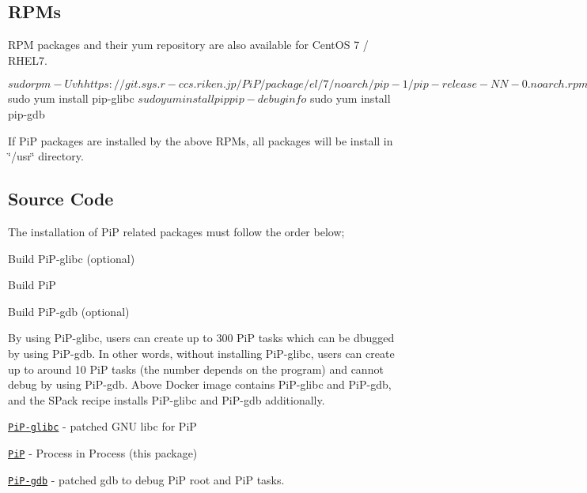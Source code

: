 \subsection*{R\-P\-Ms}

R\-P\-M packages and their yum repository are also available for Cent\-O\-S 7 / R\-H\-E\-L7. \begin{DoxyVerb}$ sudo rpm -Uvh
https://git.sys.r-ccs.riken.jp/PiP/package/el/7/noarch/pip-1/pip-release-NN-0.noarch.rpm
$ sudo yum install pip-glibc
$ sudo yum install pip pip-debuginfo
$ sudo yum install pip-gdb
\end{DoxyVerb}


If Pi\-P packages are installed by the above R\-P\-Ms, all packages will be install in \char`\"{}/usr\char`\"{} directory.

\subsection*{Source Code}

The installation of Pi\-P related packages must follow the order below;


\begin{DoxyEnumerate}
\item Build Pi\-P-\/glibc (optional)
\item Build Pi\-P
\item Build Pi\-P-\/gdb (optional)
\end{DoxyEnumerate}

By using Pi\-P-\/glibc, users can create up to 300 Pi\-P tasks which can be dbugged by using Pi\-P-\/gdb. In other words, without installing Pi\-P-\/glibc, users can create up to around 10 Pi\-P tasks (the number depends on the program) and cannot debug by using Pi\-P-\/gdb. Above Docker image contains Pi\-P-\/glibc and Pi\-P-\/gdb, and the S\-Pack recipe installs Pi\-P-\/glibc and Pi\-P-\/gdb additionally.


\begin{DoxyItemize}
\item \href{https://github.com/RIKEN-SysSoft/PiP-glibc}{\tt Pi\-P-\/glibc} -\/ patched G\-N\-U libc for Pi\-P
\item \href{https://github.com/RIKEN-SysSoft/PiP}{\tt Pi\-P} -\/ Process in Process (this package)
\item \href{https://github.com/RIKEN-SysSoft/PiP-gdb}{\tt Pi\-P-\/gdb} -\/ patched gdb to debug Pi\-P root and Pi\-P tasks.
\end{DoxyItemize}

